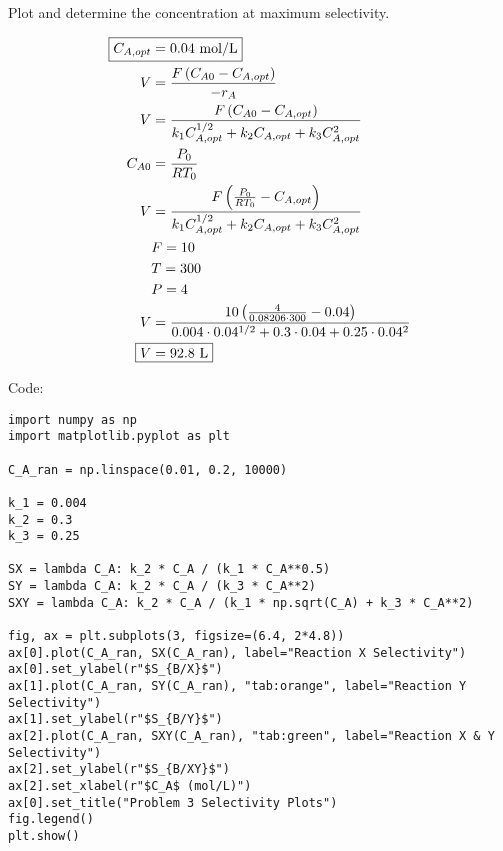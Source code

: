 \documentclass[12pt]{article}
\begin{document}
\begin{enumerate}
    Plot and determine the concentration at maximum selectivity.

    \begin{center}
        
    \end{center}

    \begin{align*}
        \Aboxed{C_{A,opt} &= 0.04 \text{ mol/L} }\\
        V &= \frac{F \left(C_{A0} - C_{A,opt}\right)}{-r_A} \\
        V &= \frac{F \left(C_{A0} - C_{A,opt}\right)}{k_1 C_{A,opt}^{1/2} + k_2 C_{A,opt} + k_3 C_{A,opt}^2} \\
        C_{A0} &= \frac{P_0}{R T_0} \\
        V &= \frac{F \left(\frac{P_0}{R T_0} - C_{A,opt}\right)}{k_1 C_{A,opt}^{1/2} + k_2 C_{A,opt} + k_3 C_{A,opt}^2} \\
        & F = 10 \\
        & T = 300 \\
        & P = 4 \\
        V &= \frac{10 \left(\frac{4}{0.08206 \cdot 300} - 0.04\right)}{0.004 \cdot 0.04^{1/2} + 0.3 \cdot 0.04 + 0.25 \cdot 0.04^2} \\
        \Aboxed{V &= 92.8 \text{ L}}
    \end{align*}

    Code:

\begin{verbatim}
import numpy as np
import matplotlib.pyplot as plt

C_A_ran = np.linspace(0.01, 0.2, 10000)

k_1 = 0.004
k_2 = 0.3
k_3 = 0.25

SX = lambda C_A: k_2 * C_A / (k_1 * C_A**0.5)
SY = lambda C_A: k_2 * C_A / (k_3 * C_A**2)
SXY = lambda C_A: k_2 * C_A / (k_1 * np.sqrt(C_A) + k_3 * C_A**2)

fig, ax = plt.subplots(3, figsize=(6.4, 2*4.8))
ax[0].plot(C_A_ran, SX(C_A_ran), label="Reaction X Selectivity")
ax[0].set_ylabel(r"$S_{B/X}$")
ax[1].plot(C_A_ran, SY(C_A_ran), "tab:orange", label="Reaction Y Selectivity")
ax[1].set_ylabel(r"$S_{B/Y}$")
ax[2].plot(C_A_ran, SXY(C_A_ran), "tab:green", label="Reaction X & Y Selectivity")
ax[2].set_ylabel(r"$S_{B/XY}$")
ax[2].set_xlabel(r"$C_A$ (mol/L)")
ax[0].set_title("Problem 3 Selectivity Plots")
fig.legend()
plt.show()


\end{verbatim}
\end{enumerate}
\end{document}
